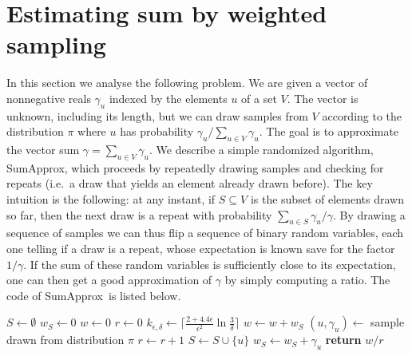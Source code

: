 \documentclass[a4paper,11pt]{article}
\newcommand{\sumest}{SumApprox}
\newcommand{\kerr}{k_{\epsilon,\delta}}
\begin{document}
\section{Estimating sum by weighted sampling}
\label{sec:sumapprox}
In this section we analyse the following problem.
We are given a vector of nonnegative reals $\gamma_u$ indexed by the elements $u$ of a set $V$.
The vector is unknown, including its length, but we can draw samples from $V$ according to the distribution $\pi$ where $u$ has probability $\gamma_u / \sum_{u \in V}\!\gamma_u$.
The goal is to approximate the vector sum $\gamma = \sum_{u \in V}\!\gamma_u$.
We describe a simple randomized algorithm, \sumest, which proceeds by repeatedly drawing samples and checking for repeats (i.e.\ a draw that yields an element already drawn before).
The key intuition is the following: at any instant, if $S \subseteq V$ is the subset of elements drawn so far, then the next draw is a repeat with probability $\sum_{u \in S} \gamma_u / \gamma$.
By drawing a sequence of samples we can thus flip a sequence of binary random variables, each one telling if a draw is a repeat, whose expectation is known save for the factor $1/\gamma$.
If the sum of these random variables is sufficiently close to its expectation, one can then get a good approximation of $\gamma$ by simply computing a ratio.
The code of \sumest\ is listed below.


\renewcommand{\thealgorithm}{}
\begin{algorithm}[h!]
\caption{\sumest($\epsilon, \delta$)}
\begin{algorithmic}[1]
\small
\State $S \leftarrow \emptyset$ 
\State $w_S\leftarrow 0$ 
\State $w\leftarrow 0$ 
\State $r\leftarrow 0$ 
\State $\kerr \leftarrow \lceil\frac{2+4.4\epsilon}{\epsilon^2}\ln{\!\frac{3}{\delta}}\rceil$ 
\vspace*{0.4em}
\While{$r < \kerr$}
\State $w\leftarrow w + w_S$
\State $(u,\gamma_u) \leftarrow $ sample drawn from distribution $\pi$
 
  \State $r \leftarrow r+1$
\Else 
  \State $S \leftarrow S \cup \{u\}$
  \State $w_S \leftarrow w_S + \gamma_u$
\EndIf
\EndWhile
\State \textbf{return} $w/r$ 
\end{algorithmic}
\end{algorithm}
\end{document}
